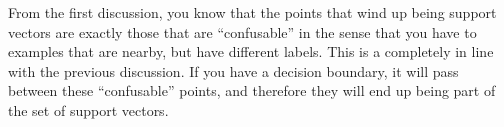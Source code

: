 From the first discussion, you know that the points that wind up being
support vectors are exactly those that are ``confusable'' in the sense
that you have to examples that are nearby, but have different labels.
This is a completely in line with the previous discussion.  If you
have a decision boundary, it will pass between these ``confusable''
points, and therefore they will end up being part of the set of
support vectors.

\begin{comment}
\section{Kernelized Regression}

Now, consider another example: linear regression (from
Section~\ref{sec:loss:reg}).  This was a linear model, under which $y
= \dotp{\vw}{\vx}+b$ and where the optimal weights are given in closed
form by:
%
\begin{align}
  \textcolor{darkred}{\vw} &= \textcolor{darkblue}{\left( \mat X \T \mat X + \la \eye_D \right)}\inv \textcolor{darkergreen}{\mat X \T \vec Y}
\end{align}
%
where $\mat X$ is the $N\times D$ data matrix, $\la$ is a
regularization parameter and $\vec Y$ is the $N\times 1$ vector of
labels.

This algorithm is, in some ways, even easier to kernelize than the
perceptron.  The optimal solution has a closed form, and 
\end{comment}


\begin{exercises}
\begin{Ex}
\TODO

\begin{solution}
\TODO
\end{solution}
\end{Ex}

\end{exercises}

